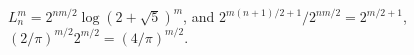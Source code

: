 $L_n^m=2^{nm/2}\log(2+\sqrt5)^m$, and $2^{m(n+1)/2+1}/2^{nm/2}=2^{m/2+1}$, $(2/\pi)^{m/2}2^{m/2}=(4/\pi)^{m/2}$.
